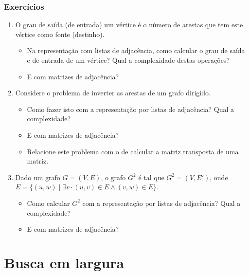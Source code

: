 \documentclass{beamer}
\begin{document}
\begin{frame}

\frametitle{Exercícios}

\begin{enumerate}
\item O grau de saída (de entrada) um vértice é o número de arestas que tem este vértice como fonte (destinho).
\begin{itemize}
\item Na representação com listas de adjacência, como calcular o grau de saída e de entrada de um vértice? Qual a complexidade destas operações?
\item E com matrizes de adjacência?
\end{itemize}
\item Considere o problema de inverter as arestas de um grafo dirigido.
\begin{itemize}
\item Como fazer isto com a representação por listas de adjacência? Qual a complexidade?
\item E com matrizes de adjacência?
\item Relacione este problema com o de calcular a matriz transposta de uma matriz.
\end{itemize}
\item Dado um grafo $G = (V, E)$, o grafo $G^2$ é tal que $G^2 = (V, E')$, onde
$E = \{ (u, w) \mid \exists v \cdot (u, v) \in E \land (v, w) \in E \}$.
\begin{itemize}
\item Como calcular $G^2$ com a representação por listas de adjacência? Qual a complexidade?
\item E com matrizes de adjacência?
\end{itemize}
\end{enumerate}

\end{frame}

\section{Busca em largura}
\end{document}
